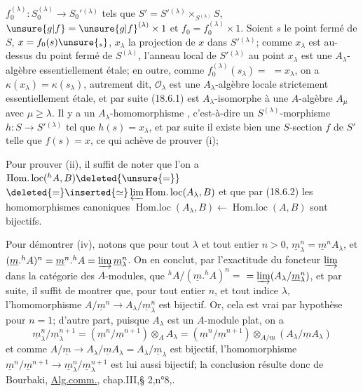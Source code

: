 
$f_0^{(\lambda)}:S_0^{(\lambda)}\to S_0'{}^{(\lambda)}$ tels que $S'=S'{}^{(\lambda)}\times_{S^{(\lambda)}}S$, $\unsure{g|f}=\unsure{g|f}^{(\lambda)}\times1$ et $f_0=f_0^{(\lambda)}\times1$.  Soient $s$ le point fermé de $S$, $x=f_0(s)\unsure{_s}$, $x_\lambda$ la projection de $x$ dans $S'{}^{(\lambda)}$; comme $x_\lambda$ est au-dessus du point fermé de $S^{(\lambda)}$, l'anneau local  de $S'{}^{(\lambda)}$ au point $x_\lambda$ est une $A_\lambda$-algèbre essentiellement étale; en outre, comme $f_0^{(\lambda)}(s_\lambda)=$ $=x_\lambda$, on a $\kappa(x_\lambda)=\kappa(s_\lambda)$, autrement dit, $\mathcal O_\lambda$ est une $A_\lambda$-algèbre locale strictement essentiellement étale, et par suite (18.6.1) est $A_\lambda$-isomorphe à une $A$-algèbre $A_\mu$ avec $\mu\geq\lambda$. Il y a  un $A_\lambda$-homomorphisme , c'est-à-dire un $S^{(\lambda)}$-morphisme $h:S\to S'{}^{(\lambda)}$ tel que $h(s)=x_\lambda$, et par suite il existe bien une $S$-section $f$ de $S'$ telle que $f(s)=x$, ce qui achève de prouver (i);

Pour prouver (ii), il suffit de noter que l'on a $\operatorname{Hom.loc}({}^h A,B)\deleted{\unsure{=}}$ $\deleted{=}\inserted{\simeq}\varprojlim\operatorname{Hom.loc}(A_\lambda,B)$ et que par (18.6.2) les homomorphismes canoniques $\operatorname{Hom.loc}(A_\lambda,B)\leftarrow\operatorname{Hom.loc}(A,B)$ sont bijectifs.

 Pour démontrer  (iv),  notons que pour tout $\lambda$ et tout entier $n>0$, $\underline m_\lambda^n=\underline m^n A_\lambda$, et $(\underline m.{}^h A)^n=\underline m^n.{}^h A=\varinjlim\underline m_\lambda^n$. On en conclut, par l'exactitude du foncteur $\varinjlim$ dans la catégorie des $A$-modules, que ${}^h A/(\underline m.{}^h A)^n=$ $=\varinjlim(A_\lambda/\underline m_\lambda^n)$, et par suite, il suffit de montrer que, pour tout entier $n$, et tout indice $\lambda$, l'homomorphisme $A/\underline m^n\to A_\lambda/\underline m_\lambda^n$ est bijectif. Or,  cela est vrai par hypothèse pour $n=1$; d'autre part, puisque $A_\lambda$ est un $A$-module plat, on a
\[
\underline m_\lambda^n/\underline m_\lambda^{n+1}=(\underline m^n/\underline m^{n+1})\otimes_A A_\lambda=(\underline m^n/\underline m^{n+1})\otimes_{A/\underline m}(A_\lambda/\underline m A_\lambda)
\]
et comme $A/\underline m\to A_\lambda/\underline m A_\lambda=A_\lambda/\underline m_\lambda$ est bijectif, l'homomorphisme $\underline m^n/\underline m^{n+1}\to\underline m_\lambda^n/\underline m_\lambda^{n+1}$ est lui aussi bijectif; la conclusion résulte donc de Bourbaki, \uline{Alg.comm.}, chap.III,§ 2,n°8,.


